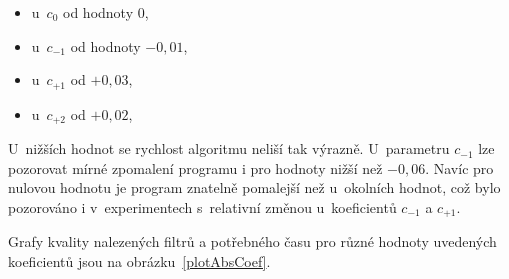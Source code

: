 \begin{itemize}
    \item u~$c_0$ od hodnoty $0$,
    \item u~$c_{-1}$ od hodnoty $-0,01$,
    \item u~$c_{+1}$ od $+0,03$,
    \item u~$c_{+2}$ od $+0,02$,
\end{itemize}

U~nižších hodnot se rychlost algoritmu neliší tak výrazně. U~parametru $c_{-1}$  lze pozorovat mírné zpomalení programu i pro hodnoty nižší než $-0,06$. Navíc pro nulovou hodnotu je program znatelně pomalejší než u~okolních hodnot, což bylo pozorováno i v~experimentech s~relativní změnou u~koeficientů $c_{-1}$ a $c_{+1}$.

Grafy kvality nalezených filtrů a potřebného času pro různé hodnoty uvedených koeficientů jsou na obrázku~\ref{plotAbsCoef}.

